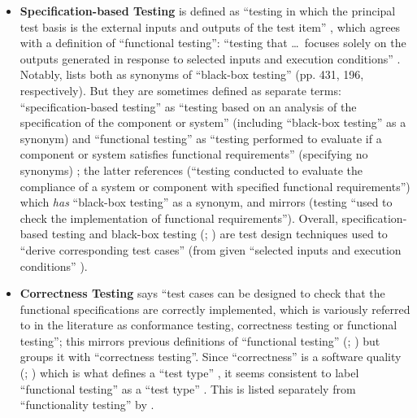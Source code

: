 \begin{itemize}
      \item \textbf{Specification-based Testing} is defined as ``testing
            in which the principal test basis is the external inputs and
            outputs of the test item'' \citep[p.~9]{IEEE2022}, which agrees
            with a definition of ``functional testing'': ``testing that
            \dots\ focuses solely on the outputs generated in response to
            selected inputs and execution conditions'' \citep[p.~196]{IEEE2017}.
            Notably, \citet{IEEE2017} lists both as synonyms of
            ``black-box testing'' (pp. 431, 196, respectively). But
            they are sometimes defined as separate terms: ``specification-based
            testing'' as ``testing based on an analysis of the specification
            of the component or system'' (including ``black-box testing'' as a
            synonym) and ``functional testing'' as ``testing performed to
            evaluate if a component or system satisfies functional
            requirements'' (specifying no synonyms) \citepISTQB{}; the latter
            references \citet[p.~196]{IEEE2017}
            (``testing conducted to evaluate the compliance of a system or
            component with specified functional requirements'') which
            \emph{has} ``black-box testing'' as a synonym, and mirrors
            \citet[p.~21]{IEEE2022} (testing ``used to check the implementation
            of functional requirements''). Overall, specification-based testing
            \citep[pp.~2-4,~6-9,~22]{IEEE2022} and black-box testing
            (\citealp[p.~5-10]{SWEBOK2024}; \citealp[p.~3]{SouzaEtAl2017})
            are test design techniques used to ``derive corresponding test cases''
            \citep[p.~11]{IEEE2022} (from given ``selected inputs and execution
            conditions'' \citep[p.~196]{IEEE2017}).

      \item \textbf{Correctness Testing} \citet[p.~5-7]{SWEBOK2024} says
            ``test cases can be designed to check that the functional
            specifications are correctly implemented, which is variously
            referred to in the literature as conformance testing, correctness
            testing or functional testing''; this mirrors previous definitions
            of ``functional testing'' (\citealp[p.~21]{IEEE2022};
            \citeyear[p.~196]{IEEE2017}) but groups it with ``correctness
            testing''. Since ``correctness'' is a software quality
            (\citealp[p.~104]{IEEE2017}; \citealp[p.~3-13]{SWEBOK2024}) which is
            what defines a ``test type'' \citep[p.~15]{IEEE2022}, it seems
            consistent to label ``functional testing'' as a ``test type''
            \citep[pp.~15,~20,~22]{IEEE2022}. This is listed separately from
            ``functionality testing'' by \citet[p.~53]{Firesmith2015}.


\end{itemize}
